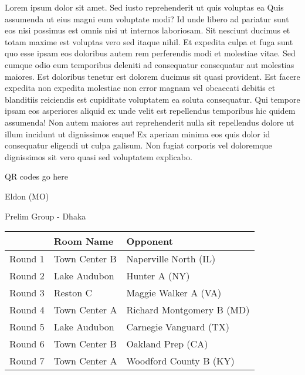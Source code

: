 \documentclass{article}%
\begin{document}
\vspace*{8pt}%
\linebreak%
\newline%
\newline%
Lorem ipsum dolor sit amet. Sed iusto reprehenderit ut quis voluptas ea Quis assumenda ut eius magni eum voluptate modi? Id unde libero ad pariatur sunt eos nisi possimus est omnis nisi ut internos laboriosam. Sit nesciunt ducimus et totam maxime est voluptas vero sed itaque nihil. Et expedita culpa et fuga sunt quo esse ipsam eos doloribus autem rem perferendis modi et molestiae vitae.\newline%
\newline%
Sed cumque odio eum temporibus deleniti ad consequatur consequatur aut molestias maiores. Est doloribus tenetur est dolorem ducimus sit quasi provident. Est facere expedita non expedita molestiae non error magnam vel obcaecati debitis et blanditiis reiciendis est cupiditate voluptatem ea soluta consequatur. Qui tempore ipsam eos asperiores aliquid ex unde velit est repellendus temporibus hic quidem assumenda!\newline%
\newline%
Non autem maiores aut reprehenderit nulla sit repellendus dolore ut illum incidunt ut dignissimos eaque! Ex aperiam minima eos quis dolor id consequatur eligendi ut culpa galisum. Non fugiat corporis vel doloremque dignissimos sit vero quasi sed voluptatem explicabo.\newline%
\newline%
%
\vspace*{30pt}%
\begin{center}%
\begin{Huge}%
QR codes go here%
\end{Huge}%
\end{center}%
\newpage%
%
\begin{center}%
\begin{Huge}%
Eldon (MO)%
\end{Huge}%
\vspace*{8pt}%
\linebreak%
\begin{Large}%
Prelim Group {-} Dhaka%
\end{Large}%
\end{center}%
\begin{tabularx}{\textwidth}{|c|Y|Y|}%
\hline%
&Room Name&Opponent\\%
\hline%
Round 1&Town Center B&Naperville North (IL)\\%
Round 2&Lake Audubon&Hunter A (NY)\\%
Round 3&Reston C&Maggie Walker A (VA)\\%
Round 4&Town Center A&Richard Montgomery B (MD)\\%
Round 5&Lake Audubon&Carnegie Vanguard (TX)\\%
Round 6&Town Center B&Oakland Prep (CA)\\%
Round 7&Town Center A&Woodford County B (KY)\\%
\hline%
\end{tabularx}%
\end{document}
